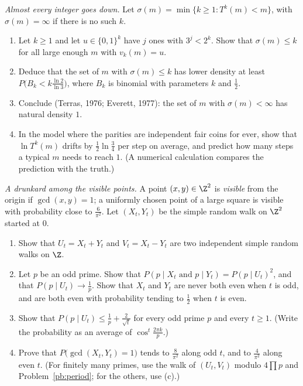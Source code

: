 \begin{exercise}[$\star\star\star$]\label{pb:everett}
\emph{Almost every integer goes down.} Let $\sigma(m)=\min\{k\ge1:T^k(m)<m\}$, with $\sigma(m)=\infty$ if there is no such $k$.
\begin{enumerate}[label=(\alph*)]
\item Let $k\ge1$ and let $u\in\{0,1\}^k$ have $j$ ones with $3^j<2^k$. Show that $\sigma(m)\le k$ for all large enough $m$ with $v_k(m)=u$.
\item Deduce that the set of $m$ with $\sigma(m)\le k$ has lower density at least $P\bigl(B_k<k\frac{\ln2}{\ln3}\bigr)$, where $B_k$ is binomial with parameters $k$
and $\frac12$.
\item Conclude (Terras, 1976; Everett, 1977): the set of $m$ with $\sigma(m)<\infty$ has natural density $1$.
\item In the model where the parities are independent fair coins for ever, show that $\ln T^k(m)$ drifts by $\frac12\ln\frac34$ per step on average, and
predict how many steps a typical $m$ needs to reach $1$. (A numerical calculation compares the prediction with the truth.)
\end{enumerate}
\end{exercise}

\begin{exercise}[Journey]\label{pb:coprimewalk}
\emph{A drunkard among the visible points.} A point $(x,y)\in\Z^2$ is \emph{visible} from the origin if $\gcd(x,y)=1$; a uniformly chosen point of a
large square is visible with probability close to $\frac6{\pi^2}$. Let $(X_t,Y_t)$ be the simple random walk on $\Z^2$ started at $0$.
\begin{enumerate}[label=(\alph*)]
\item Show that $U_t=X_t+Y_t$ and $V_t=X_t-Y_t$ are two independent simple random walks on $\Z$.
\item Let $p$ be an odd prime. Show that $P(p\mid X_t\text{ and }p\mid Y_t)=P(p\mid U_t)^2$, and that $P(p\mid U_t)\to\frac1p$. Show that $X_t$ and $Y_t$ are never both even when $t$ is
odd, and are both even with probability tending to $\frac12$ when $t$ is even.
\item Show that $P(p\mid U_t)\le\frac1p+\frac2{\sqrt t}$ for every odd prime $p$ and every $t\ge1$. (Write the probability as an average of $\cos^t\frac{2\pi k}p$.)
\item Prove that $P\bigl(\gcd(X_t,Y_t)=1\bigr)$ tends to $\frac8{\pi^2}$ along odd $t$, and to $\frac4{\pi^2}$ along even $t$. (For finitely many primes, use the walk of $(U_t,V_t)$
modulo $4\prod p$ and Problem~\ref{pb:period}; for the others, use (c).)
\end{enumerate}
\end{exercise}

